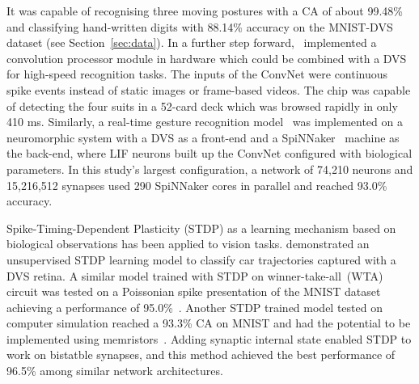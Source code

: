 It was capable of recognising three moving postures with a CA of about 99.48\% and classifying hand-written digits with 88.14\% accuracy on the MNIST-DVS dataset (see Section~\ref{sec:data}).
In a further step forward,~\cite{camunas2012event} implemented a convolution processor module in hardware which could be combined with a DVS for high-speed recognition tasks.
The inputs of the ConvNet were continuous spike events instead of static images or frame-based videos. 
The chip was capable of detecting the four suits in a 52-card deck which was browsed rapidly in only 410 ms.
Similarly, a real-time gesture recognition model~\cite{liu2014real} was implemented on a neuromorphic system with a DVS as a front-end and a SpiNNaker~\cite{furber2014spinnaker} machine as the back-end, where LIF neurons built up the ConvNet configured with biological parameters.
In this study's largest configuration, a network of 74,210 neurons and 15,216,512 synapses used 290 SpiNNaker cores in parallel and reached 93.0\% accuracy. 

Spike-Timing-Dependent Plasticity (STDP) as  a learning mechanism based on biological observations has been applied to vision tasks.
\cite{bichler2012extraction} demonstrated an unsupervised STDP learning model to classify car trajectories captured with a DVS retina. 
A similar model trained with STDP on winner-take-all~(WTA) circuit was tested on a Poissonian spike presentation of the MNIST dataset achieving a performance of 95.0\%~\cite{diehl2015unsupervised}.
Another STDP trained model tested on computer simulation reached a 93.3\% CA on MNIST and had the potential to be implemented using memristors~\cite{bill2014compound}. 
Adding synaptic internal state enabled STDP to work on bistatble synapses, and this method achieved the best performance of 96.5\% among similar network architectures. 

